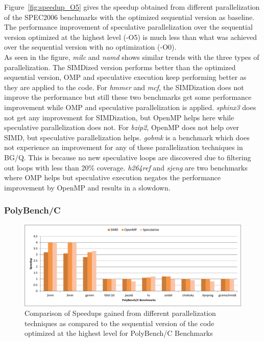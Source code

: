 \documentclass[10pt]{report}          %
\begin{document}
Figure~\ref{fig:speedup_O5} gives the speedup obtained from different parallelization of the SPEC2006 benchmarks with the optimized sequential version as baseline. The performance improvement of speculative parallelization over the sequential version optimized at the highest level (-O5) is much less than what was achieved over the sequential version with no optimization (-O0). \\

As seen in the figure, \textit{milc} and \textit{namd} shows similar trends with the three types of parallelization.  The SIMDized version performs better than the optimized sequential version, OMP and speculative execution keep performing better as they are applied to the code.  For \textit{hmmer} and \textit{mcf}, the SIMDization does not improve the performance but still these two benchmarks get some performance improvement while OMP and speculative parallelization is applied. \textit{sphinx3} does not get any improvement for SIMDization, but OpenMP helps here while speculative parallelization does not.  For \textit{bzip2}, OpenMP does not help over SIMD, but speculative parallelization helps.  \textit{gobmk} is a benchmark which does not experience an improvement for any of these parallelization techniques in BG/Q. This is because no new speculative loops are discovered due to filtering out loops with less than 20\% coverage.  \textit{h264ref} and \textit{sjeng} are two benchmarks where OMP helps but speculative execution negates the performance improvement by OpenMP and results in a slowdown.

\subsubsection{PolyBench/C}

\begin{figure}[h]
\centering
\includegraphics[scale=0.56]{./pdf/poly_O5.pdf}
\caption{Comparison of Speedups gained from different parallelization techniques as compared to the sequential version of the code optimized at the highest level for PolyBench/C Benchmarks}
\label{fig:poly_O5}
\end{figure}
\end{document}
